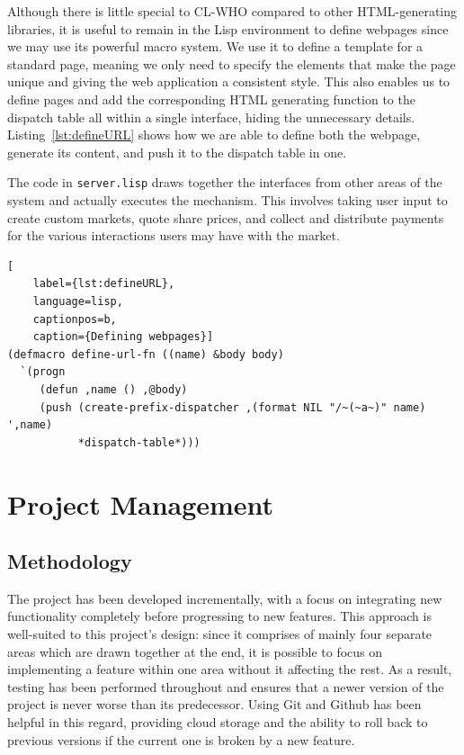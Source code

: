 \documentclass[10pt,a4paper]{article}
\theoremstyle{plain}
\theoremstyle{definition}
\newcommand{\code}[1]{\texttt{#1}}
\begin{document}
Although there is little special to CL-WHO compared to other HTML-generating
libraries, it is useful to remain in the Lisp environment to define webpages
since we may use its powerful macro system. We use it to define a template for
a standard page, meaning we only need to specify the elements that make the
page unique and giving the web application a consistent style. This also
enables us to define pages and add the corresponding HTML generating function
to the dispatch table all within a single interface, hiding the unnecessary
details. Listing~\ref{lst:defineURL} shows how we are able to define both the
webpage, generate its content, and push it to the dispatch table in one.

The code in \code{server.lisp} draws together the interfaces from other areas
of the system and actually executes the mechanism. This involves taking user
input to create custom markets, quote share prices, and collect and distribute
payments for the various interactions users may have with the market.

\begin{lstlisting}[
	label={lst:defineURL},
	language=lisp,
	captionpos=b,
	caption={Defining webpages}]
(defmacro define-url-fn ((name) &body body)
  `(progn
     (defun ,name () ,@body)
     (push (create-prefix-dispatcher ,(format NIL "/~(~a~)" name) ',name)
           *dispatch-table*)))
\end{lstlisting}

\section{Project Management}

\label{sec:projectManagement}

\subsection{Methodology}

The project has been developed incrementally, with a focus on integrating new
functionality completely before progressing to new features. This approach is
well-suited to this project's design: since it comprises of mainly four
separate areas which are drawn together at the end, it is possible to focus on
implementing a feature within one area without it affecting the rest. As a
result, testing has been performed throughout and ensures that a newer version
of the project is never worse than its predecessor. Using Git and Github has
been helpful in this regard, providing cloud storage and the ability to roll
back to previous versions if the current one is broken by a new feature.
\end{document}
